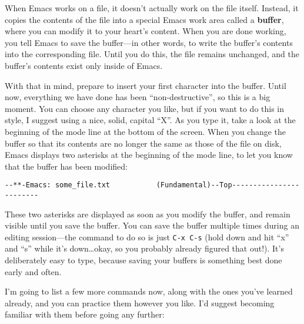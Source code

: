 When Emacs works on a file, it doesn't actually work on the file
itself.  Instead, it copies the contents of the file into a special
Emacs work area called a {\bf buffer}, where you can modify it to your
heart's content.  When you are done working, you tell Emacs to save
the buffer---in other words, to write the buffer's contents into the
corresponding file.  Until you do this, the file remains unchanged,
and the buffer's contents exist only inside of Emacs.

        With that in mind, prepare to insert your first character into
the buffer.  Until now, everything we have done has been
``non-destructive'', so this is a big moment.  You can choose any
character you like, but if you want to do this in style, I suggest
using a nice, solid, capital ``X''.  As you type it, take a look at
the beginning of the mode line at the bottom of the screen.  When you
change the buffer so that its contents are no longer the same as those
of the file on disk, Emacs displays two asterisks at the beginning of
the mode line, to let you know that the buffer has been modified:

\begin{screen}
   \begin{verbatim}
--**-Emacs: some_file.txt           (Fundamental)--Top------------------------
\end{verbatim}
\end{screen}

        These two asterisks are displayed as soon as you modify the
buffer, and remain visible until you save the buffer.  You can save
the buffer multiple times during an editing session---the command to
do so is just {\tt C-x~C-s} (hold down  and hit ``x''
and ``s'' while it's down\ldots okay, so you probably already figured
that out!).  It's deliberately easy to type, because saving your
buffers is something best done early and often.

I'm going to list a few more commands now, along with the ones you've
learned already, and you can practice them however you like.  I'd
suggest becoming familiar with them before going any further:

